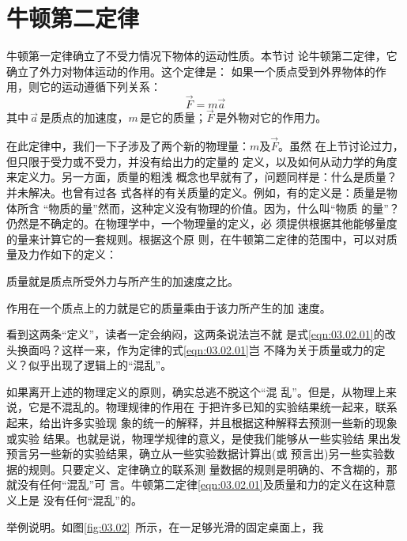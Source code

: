 \section{牛顿第二定律}\label{sec:03.02}

{牛顿第一定律确立了不受力情况下物体的运动性质。本节讨
  论牛顿第二定律，它确立了外力对物体运动的作用。这个定律是：
  如果一个质点受到外界物体的作用，则它的运动遵循下列关系：}
\begin{equation}\label{eqn:03.02.01}
  \vec{F} = m \vec{a}
\end{equation}
其中\,$\vec{a}$\,是质点的加速度，$m$\,是它的质量；$\vec{F}$\,是外物对它的作用力。

{在此定律中，我们一下子涉及了两个新的物理量：$m$及$\vec{F}$。虽然
在上节讨论过力，但只限于受力或不受力，并没有给出力的定量的
定义，以及如何从动力学的角度来定义力。另一方面，质量的粗浅
概念也早就有了，问题同样是：什么是质量？并未解决。也曾有过各
式各样的有关质量的定义。例如，有的定义是：质量是物体所含
“物质的量”然而，这种定义没有物理的价值。因为，什么叫“物质
的量”？仍然是不确定的。在物理学中，一个物理量的定义，必
须提供根据其他能够量度的量来计算它的一套规则。根据这个原
则，在牛顿第二定律的范围中，可以对质量及力作如下的定义：}

质量就是质点所受外力与所产生的加速度之比。

作用在一个质点上的力就是它的质量乘由于该力所产生的加
速度。

看到这两条“定义”，读者一定会纳闷，这两条说法岂不就
是式\eqref{eqn:03.02.01}的改头换面吗？这样一来，作为定律的式\eqref{eqn:03.02.01}岂
不降为关于质量或力的定义？似乎出现了逻辑上的“混乱”。

如果离开上述的物理定义的原则，确实总逃不脱这个“混
乱”。但是，从物理上来说，它是不混乱的。物理规律的作用在
于把许多已知的实验结果统一起来，联系起来，给出许多实验现
象的统一的解释，并且根据这种解释去预测一些新的现象或实验
结果。也就是说，物理学规律的意义，是使我们能够从一些实验结
果出发预言另一些新的实验结果，确立从一些实验数据计算出(或
预言出)另一些实验数据的规则。只要定义、定律确立的联系测
量数据的规则是明确的、不含糊的，那就没有任何“混乱”可
言。牛顿第二定律\lhbrak \eqref{eqn:03.02.01}\rhbrak 及质量和力的定义在这种意义上是
没有任何“混乱”的。

举例说明。如图\ref{fig:03.02}~所示，在一足够光滑的固定桌面上，我

